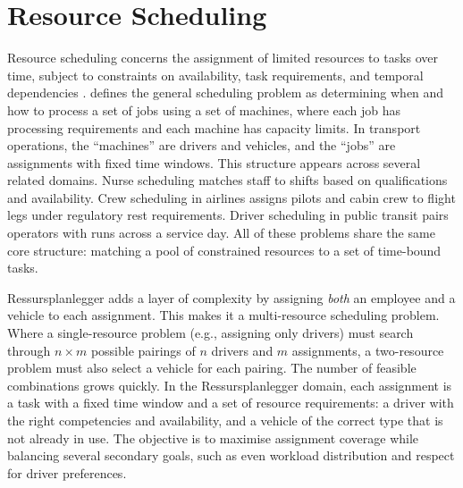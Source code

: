 \section{Resource Scheduling}
\label{sec:resource-scheduling}

Resource scheduling concerns the assignment of limited resources to tasks over time, subject to constraints on availability, task requirements, and temporal dependencies \parencite{pinedo2016scheduling}. \textcite{pinedo2016scheduling} defines the general scheduling problem as determining when and how to process a set of jobs using a set of machines, where each job has processing requirements and each machine has capacity limits. In transport operations, the ``machines'' are drivers and vehicles, and the ``jobs'' are assignments with fixed time windows. This structure appears across several related domains. Nurse scheduling matches staff to shifts based on qualifications and availability. Crew scheduling in airlines assigns pilots and cabin crew to flight legs under regulatory rest requirements. Driver scheduling in public transit pairs operators with runs across a service day. All of these problems share the same core structure: matching a pool of constrained resources to a set of time-bound tasks.

Ressursplanlegger adds a layer of complexity by assigning \emph{both} an employee and a vehicle to each assignment. This makes it a multi-resource scheduling problem. Where a single-resource problem (e.g., assigning only drivers) must search through $n \times m$ possible pairings of $n$ drivers and $m$ assignments, a two-resource problem must also select a vehicle for each pairing. The number of feasible combinations grows quickly. In the Ressursplanlegger domain, each assignment is a task with a fixed time window and a set of resource requirements: a driver with the right competencies and availability, and a vehicle of the correct type that is not already in use. The objective is to maximise assignment coverage while balancing several secondary goals, such as even workload distribution and respect for driver preferences.

